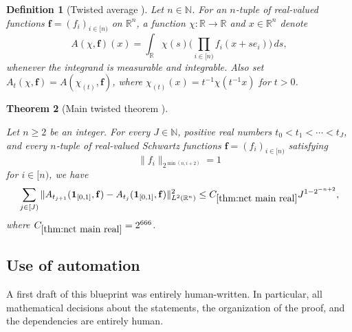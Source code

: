 \documentclass[12pt,reqno]{amsart}
\theoremstyle{plain}
\newtheorem{theorem}{Theorem}[section]
\newtheorem{definition}[theorem]{Definition}
\numberwithin{equation}{section}
\theoremstyle{remark}
\newcommand{\uses}[1]{}
\newcommand{\usesdefs}[1]{}
\newcommand{\leanok}{}
\newcommand{\lean}[1]{}
\DeclareRobustCommand{\leanlink}[1]{%
    \href
    {https://pjroos.com/lean-nct/docs/find/?pattern=#1\&strict=false\#doc}
    {\ensuremath{\forall}}
}
\newcommand{\R}{{\mathbb R}}
\begin{document}
 



\begin{definition}[Twisted average \leanlink{nCT.twistedAverage}, \leanlink{nCT.rescaledTwistedAverage}]\lean{nCT.twistedAverage,nCT.rescaledTwistedAverage}
Let $n\in\mathbb{N}$. For an $n$-tuple of real-valued functions $\mathbf f = (f_i)_{i\in [n)}$ on $\R^n$, a function $\chi:\R\to\R$ and $x\in\mathbb{R}^n$ denote
\begin{equation}\label{A_def}\uses{}\usesdefs{}
A(\chi,\mathbf f)(x) = \int_{\mathbb{R}} \chi(s)\Big(\prod_{i\in [n)} f_i(x+se_i)\Big)\,ds,
\end{equation}
whenever the integrand is measurable and integrable.
Also set $A_t(\chi,\mathbf{f})=A(\chi_{(t)},\mathbf{f})$, where $\chi_{(t)}(x)=t^{-1}\chi(t^{-1}x)$ for $t>0$.
\end{definition}

\begin{theorem}[Main twisted theorem \leanlink{nCT.main_twisted_theorem}]\label{thm:nct main real}\uses{lem:smoothingdecomp,lem:norm_A_sum_le_sum,lem:mainbump1,lem:mainbump2,lem:leftbump,lem:leftbump1,constant main bump one,constant main bump two,constant left bump,constant left bump one}\usesdefs{A_def,defn:window based bump functions}
\lean{nCT.main_twisted_theorem}
\leanok
Let $n\ge 2$ be an integer. For every $J\in\mathbb{N}$, positive real numbers $t_0<t_1<\cdots<t_J$, and every $n$-tuple of real-valued Schwartz functions ${\mathbf f}=(f_i)_{i\in[n)}$ satisfying
\begin{equation}\label{main twisted normalization}
\|f_i\|_{2^{\min(n,i+2)}}=1
\end{equation}
for $i\in[n)$, we have 
\begin{equation}\label{e:ncommuting_real}
\sum_{j\in[J)}\|A_{t_{j+1}}(\mathbf 1_{[0,1]},\mathbf f)-A_{t_j}(\mathbf 1_{[0,1]},\mathbf f)\|_{L^2(\R^n)}^2
\le C_{\ref{thm:nct main real}}J^{1-2^{-n+2}},
\end{equation}
where $C_{\ref{thm:nct main real}}=2^{666}$.
\end{theorem}

\subsection{Use of automation}\label{sec:comments-on-automation}
A first draft of this blueprint was entirely human-written.
In particular, all mathematical decisions about the statements, the organization of the proof, and the dependencies are entirely human.
\end{document}
